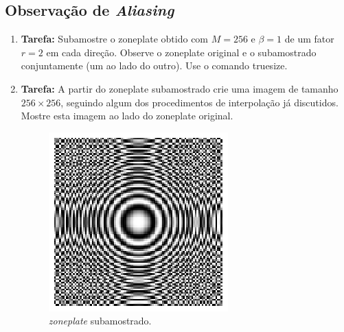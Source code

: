 \documentclass[11pt]{article}
\begin{document}
\subsection{Observação de \emph{Aliasing}}
\begin{enumerate}
\item \textbf{Tarefa:} Subamostre o zoneplate obtido com $M = 256$ e $\beta= 1$ de um fator $r=2$ em cada direção.
Observe o zoneplate original e o subamostrado conjuntamente (um ao lado do outro). Use o comando \textsf{truesize}.

\item \textbf{Tarefa:} A partir do zoneplate subamostrado crie uma imagem de tamanho $256 \times 256$, seguindo algum dos procedimentos de interpolação já discutidos. Mostre esta imagem ao lado do zoneplate original.

\begin{figure}[htb!]
	\centering
	\includegraphics[scale=1]{../imgs/fig2.eps}
	\caption{\textit{zoneplate} subamostrado.}
\end{figure}


\end{enumerate}
\end{document}
